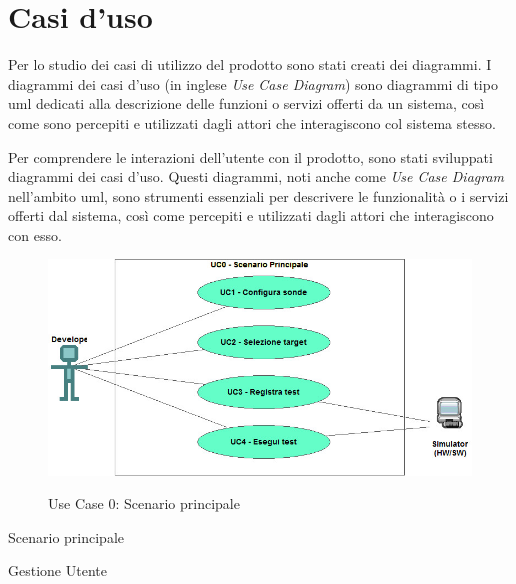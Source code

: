 \section{Casi d'uso}
Per lo studio dei casi di utilizzo del prodotto sono stati creati dei diagrammi.
I diagrammi dei casi d'uso (in inglese \textit{Use Case Diagram}) sono diagrammi di tipo \gls{uml} dedicati alla descrizione delle funzioni o servizi offerti da un sistema, così come sono percepiti e utilizzati dagli attori che interagiscono col sistema stesso.

Per comprendere le interazioni dell'utente con il prodotto, sono stati sviluppati diagrammi dei casi d'uso. 
Questi diagrammi, noti anche come \textit{Use Case Diagram} nell'ambito \gls{uml}, sono strumenti essenziali per descrivere le funzionalità o i servizi offerti dal sistema, così come percepiti e utilizzati dagli attori che interagiscono con esso.
\begin{figure}[H]
    \vspace{2em}
    \centering
    \includegraphics[alt={Testo alternativo dell'immagine}, width=0.75\columnwidth]{img/usecase/scenario-principale.jpeg}
    \caption{Use Case 0: Scenario principale}
    \label{fig:scenario_principale}
\end{figure}

\begin{usecase}{0}{Scenario principale}
    \label{uc:uc_scenario_principale}
\end{usecase}

\begin{usecase}{1}{Gestione Utente}
    \label{uc:uc_casi_uso}
\end{usecase}

